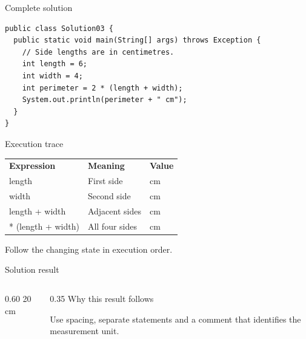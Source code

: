 \documentclass[10pt,aspectratio=169]{beamer}
\begin{document}
\begin{frame}[fragile,t]{Complete solution}
\begin{lstlisting}
public class Solution03 {
  public static void main(String[] args) throws Exception {
    // Side lengths are in centimetres.
    int length = 6;
    int width = 4;
    int perimeter = 2 * (length + width);
    System.out.println(perimeter + " cm");
  }
}
\end{lstlisting}
\end{frame}

\begin{frame}[fragile,t]{Execution trace}
\small\renewcommand{\arraystretch}{1.5}
\begin{tabularx}{\textwidth}{>{\raggedright\arraybackslash}X>{\raggedright\arraybackslash}X>{\raggedright\arraybackslash}X}
\rowcolor{navy}
\color{white}\bfseries Expression & \color{white}\bfseries Meaning & \color{white}\bfseries Value\\
length & First side & 6 cm\\
width & Second side & 4 cm\\
length + width & Adjacent sides & 10 cm\\
2 * (length + width) & All four sides & 20 cm\\
\end{tabularx}
\vspace{3mm}\footnotesize Follow the changing state in execution order.
\end{frame}

\begin{frame}[fragile,t]{Solution result}
\begin{columns}[T,onlytextwidth]\begin{column}{0.60\textwidth}
20 cm
\end{column}\begin{column}{0.35\textwidth}\small
Why this result follows

Use spacing, separate statements and a comment that identifies the measurement unit.
\end{column}\end{columns}
\end{frame}
\end{document}
